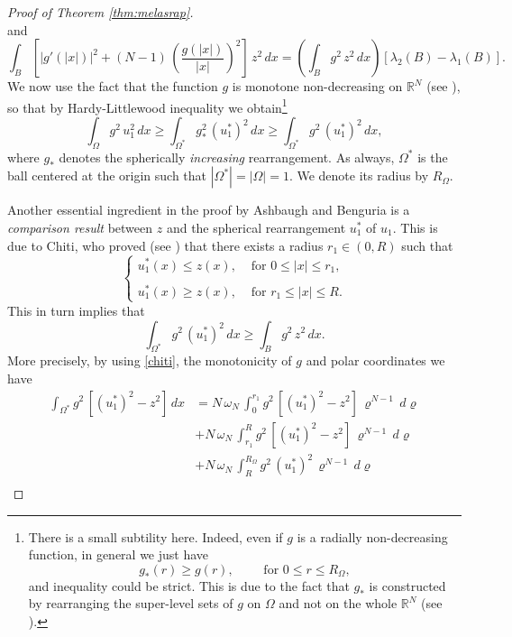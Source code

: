 \documentclass{amsart}
\theoremstyle{definition}
\numberwithin{equation}{section}
\begin{document}
\begin{proof}[Proof of Theorem \ref{thm:melasrap}]
\begin{equation}
\end{equation}
and
\begin{equation}
\label{lambdi22}
\int_B \left[|g'(|x|)|^2+(N-1)\, \left(\frac{g(|x|)}{|x|}\right)^2\right]\, z^2\, dx=
\left(\int_B g^2\, z^2\, dx\right)[\lambda_2(B)-\lambda_1(B)].
\end{equation}
We now use the fact that the function $g$ is monotone non-decreasing on $\mathbb{R}^N$ (see \cite[Theorem 3.3]{MR1166646}), so that by Hardy-Littlewood inequality we obtain\footnote{There is a small subtility here. Indeed, even if $g$ is a radially non-decreasing function, in general we just have 
\[
g_*(r)\ge g(r),\qquad \mbox{ for } 0\le r\le R_\Omega,
\]
and inequality could be strict. This is due to the fact that $g_*$ is constructed by rearranging the super-level sets of $g$ on $\Omega$ and not on the whole $\mathbb{R}^N$ (see \cite[page 606]{MR1166646}).}
\[
\int_\Omega g^2\, u_1^2\, dx\ge \int_{\Omega^*} g_*^2\, (u^*_1)^2\, dx\ge \int_{\Omega^*} g^2\,(u^*_1)^2\,dx,
\]
where $g_*$ denotes the spherically {\it increasing} rearrangement. As always, $\Omega^*$ is the ball centered at the origin such that $|\Omega^*|=|\Omega|=1$. We denote its radius by $R_\Omega$.
\par
Another essential ingredient in the proof by Ashbaugh and Benguria is a {\it comparison result} between $z$ and the spherical rearrangement $u_1^*$ of $u_1$. This is due to Chiti, who proved (see \cite{MR0652376}) that there exists a radius $r_1\in(0,R)$ such that
\begin{equation}
\label{chiti}
\left\{\begin{array}{cc} 
u^*_1(x)\le z(x),& \mbox{ for } 0\le|x|\le r_1,\\ 
&\\
u^*_1(x)\ge z(x),& \mbox{ for } r_1\le|x|\le R.  
\end{array}
\right.
\end{equation}
This in turn implies that
\[
\int_{\Omega^*} g^2\, (u^*_1)^2\, dx\ge \int_B g^2\, z^2\, dx. 
\]
More precisely, by using \eqref{chiti}, the monotonicity of $g$ and polar coordinates we have
\[
\begin{split}
\int_{\Omega^*} g^2\, [(u^*_1)^2-z^2]\, dx&=N\,\omega_N\, \int_0^{r_1} g^2\, [(u^*_1)^2-z^2]\, \varrho^{N-1}\, d\varrho\\
&+N\,\omega_N\, \int_{r_1}^{R} g^2\, [(u^*_1)^2-z^2]\, \varrho^{N-1}\, d\varrho\\
&+N\,\omega_N\,\int_R^{R_\Omega} g^2\, (u^*_1)^2\, \varrho^{N-1}\, d\varrho\\

\end{split}\]
\end{proof}
\end{document}
